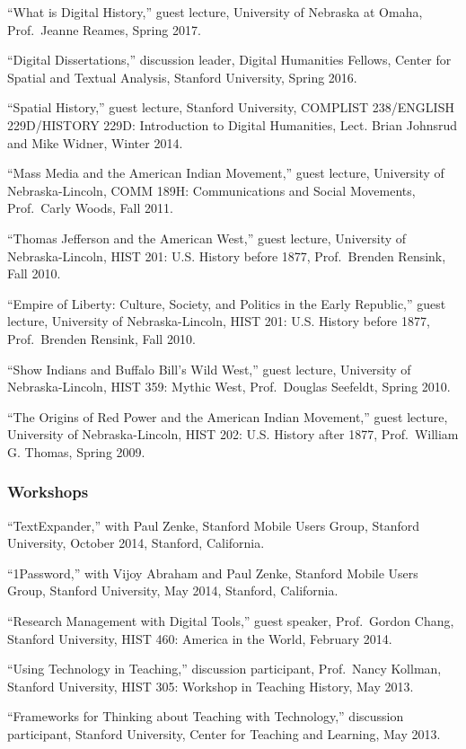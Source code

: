 ``What is Digital History,'' guest lecture, University of Nebraska at
Omaha, Prof.~Jeanne Reames, Spring 2017.

``Digital Dissertations,'' discussion leader, Digital Humanities
Fellows, Center for Spatial and Textual Analysis, Stanford University,
Spring 2016.

``Spatial History,'' guest lecture, Stanford University, COMPLIST
238/ENGLISH 229D/HISTORY 229D: Introduction to Digital Humanities, Lect.
Brian Johnsrud and Mike Widner, Winter 2014.

``Mass Media and the American Indian Movement,'' guest lecture,
University of Nebraska-Lincoln, COMM 189H: Communications and Social
Movements, Prof.~Carly Woods, Fall 2011.

``Thomas Jefferson and the American West,'' guest lecture, University of
Nebraska-Lincoln, HIST 201: U.S. History before 1877, Prof.~Brenden
Rensink, Fall 2010.

``Empire of Liberty: Culture, Society, and Politics in the Early
Republic,'' guest lecture, University of Nebraska-Lincoln, HIST 201:
U.S. History before 1877, Prof.~Brenden Rensink, Fall 2010.

``Show Indians and Buffalo Bill's Wild West,'' guest lecture, University
of Nebraska-Lincoln, HIST 359: Mythic West, Prof.~Douglas Seefeldt,
Spring 2010.

``The Origins of Red Power and the American Indian Movement,'' guest
lecture, University of Nebraska-Lincoln, HIST 202: U.S. History after
1877, Prof.~William G. Thomas, Spring 2009.

\subsubsection{Workshops}\label{workshops}

``TextExpander,'' with Paul Zenke, Stanford Mobile Users Group, Stanford
University, October 2014, Stanford, California.

``1Password,'' with Vijoy Abraham and Paul Zenke, Stanford Mobile Users
Group, Stanford University, May 2014, Stanford, California.

``Research Management with Digital Tools,'' guest speaker, Prof.~Gordon
Chang, Stanford University, HIST 460: America in the World, February
2014.

``Using Technology in Teaching,'' discussion participant, Prof.~Nancy
Kollman, Stanford University, HIST 305: Workshop in Teaching History,
May 2013.

``Frameworks for Thinking about Teaching with Technology,'' discussion
participant, Stanford University, Center for Teaching and Learning, May
2013.

